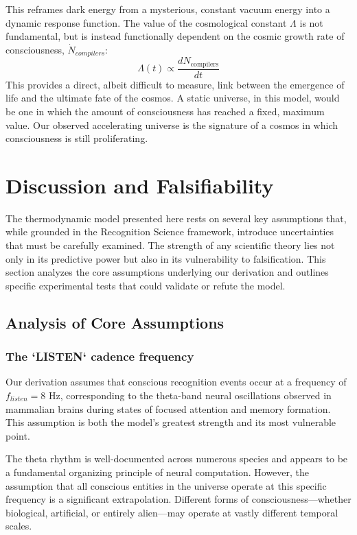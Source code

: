 \documentclass[11pt,a4paper]{article}
\theoremstyle{definition}
\theoremstyle{remark}
\begin{document}
This reframes dark energy from a mysterious, constant vacuum energy into a dynamic response function. The value of the cosmological constant \(\Lambda\) is not fundamental, but is instead functionally dependent on the cosmic growth rate of consciousness, \(\dot{N}_{compilers}\):
\begin{equation}
    \Lambda(t) \propto \frac{d N_{\text{compilers}}}{dt}
\end{equation}
This provides a direct, albeit difficult to measure, link between the emergence of life and the ultimate fate of the cosmos. A static universe, in this model, would be one in which the amount of consciousness has reached a fixed, maximum value. Our observed accelerating universe is the signature of a cosmos in which consciousness is still proliferating.

\section{Discussion and Falsifiability}

The thermodynamic model presented here rests on several key assumptions that, while grounded in the Recognition Science framework, introduce uncertainties that must be carefully examined. The strength of any scientific theory lies not only in its predictive power but also in its vulnerability to falsification. This section analyzes the core assumptions underlying our derivation and outlines specific experimental tests that could validate or refute the model.

\subsection{Analysis of Core Assumptions}

\subsubsection{The `LISTEN` cadence frequency}

Our derivation assumes that conscious recognition events occur at a frequency of \(f_{listen} = 8 \text{ Hz}\), corresponding to the theta-band neural oscillations observed in mammalian brains during states of focused attention and memory formation. This assumption is both the model's greatest strength and its most vulnerable point.

The theta rhythm is well-documented across numerous species and appears to be a fundamental organizing principle of neural computation. However, the assumption that all conscious entities in the universe operate at this specific frequency is a significant extrapolation. Different forms of consciousness—whether biological, artificial, or entirely alien—may operate at vastly different temporal scales.
\end{document}

